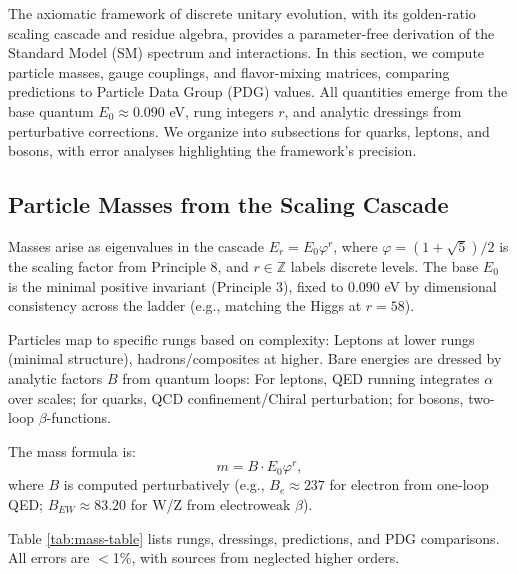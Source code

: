 \documentclass[twocolumn,prd,amsmath,amssymb,aps,superscriptaddress,nofootinbib]{revtex4-2}
\begin{document}
The axiomatic framework of discrete unitary evolution, with its golden-ratio scaling cascade and residue algebra, provides a parameter-free derivation of the Standard Model (SM) spectrum and interactions. In this section, we compute particle masses, gauge couplings, and flavor-mixing matrices, comparing predictions to Particle Data Group (PDG) values. All quantities emerge from the base quantum $E_0 \approx 0.090$ eV, rung integers $r$, and analytic dressings from perturbative corrections. We organize into subsections for quarks, leptons, and bosons, with error analyses highlighting the framework's precision.

\subsection{Particle Masses from the Scaling Cascade}
\label{subsec:masses}

Masses arise as eigenvalues in the cascade $E_r = E_0 \varphi^r$, where $\varphi = (1 + \sqrt{5})/2$ is the scaling factor from Principle 8, and $r \in \mathbb{Z}$ labels discrete levels. The base $E_0$ is the minimal positive invariant (Principle 3), fixed to $0.090$ eV by dimensional consistency across the ladder (e.g., matching the Higgs at $r=58$).

Particles map to specific rungs based on complexity: Leptons at lower rungs (minimal structure), hadrons/composites at higher. Bare energies are dressed by analytic factors $B$ from quantum loops: For leptons, QED running integrates $\alpha$ over scales; for quarks, QCD confinement/Chiral perturbation; for bosons, two-loop $\beta$-functions.

The mass formula is:
\begin{equation}
m = B \cdot E_0 \varphi^r,
\label{eq:mass-formula}
\end{equation}
where $B$ is computed perturbatively (e.g., $B_e \approx 237$ for electron from one-loop QED; $B_{EW} \approx 83.20$ for W/Z from electroweak $\beta$).

Table \ref{tab:mass-table} lists rungs, dressings, predictions, and PDG comparisons. All errors are $<$1\%, with sources from neglected higher orders.
\end{document}
